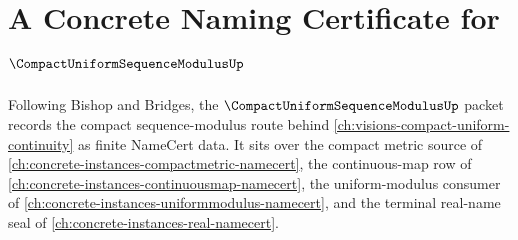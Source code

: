 \chapter{A Concrete Naming Certificate for $\CompactUniformSequenceModulusUp$}
\label{ch:concrete-instances-compact-uniform-sequence-modulus-namecert}

Following Bishop and Bridges, the $\CompactUniformSequenceModulusUp$ packet records the compact sequence-modulus route behind \autoref{ch:visions-compact-uniform-continuity} as finite NameCert data. It sits over the compact metric source of \autoref{ch:concrete-instances-compactmetric-namecert}, the continuous-map row of \autoref{ch:concrete-instances-continuousmap-namecert}, the uniform-modulus consumer of \autoref{ch:concrete-instances-uniformmodulus-namecert}, and the terminal real-name seal of \autoref{ch:concrete-instances-real-namecert}.

